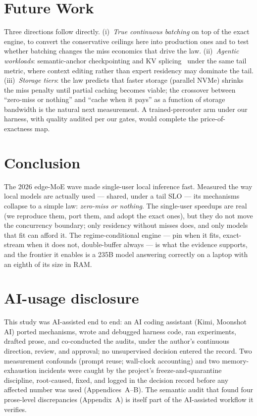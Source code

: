 \documentclass[11pt]{article}
\begin{document}
\section{Future Work}
\label{sec:future}

Three directions follow directly. (i)~\emph{True continuous batching} on
top of the exact engine, to convert the conservative ceilings here into
production ones and to test whether batching changes the miss economics
that drive the law. (ii)~\emph{Agentic workloads}: semantic-anchor
checkpointing and KV splicing~\cite{leyline,continuum} under the same tail
metric, where context editing rather than expert residency may dominate the
tail. (iii)~\emph{Storage tiers}: the law predicts that faster storage
(parallel NVMe) shrinks the miss penalty until partial caching becomes
viable; the crossover between ``zero-miss or nothing'' and
``cache when it pays'' as a function of storage bandwidth is the natural
next measurement. A trained-prerouter arm under our harness, with quality
audited per our gates, would complete the price-of-exactness map.

\section{Conclusion}

The 2026 edge-MoE wave made single-user local inference fast. Measured the
way local models are actually used --- shared, under a tail SLO --- its
mechanisms collapse to a simple law: \emph{zero-miss or nothing}. The
single-user speedups are real (we reproduce them, port them, and adopt the
exact ones), but they do not move the concurrency boundary; only residency
without misses does, and only models that fit can afford it. The
regime-conditional engine --- pin when it fits, exact-stream when it does
not, double-buffer always --- is what the evidence supports, and the
frontier it enables is a 235B model answering correctly on a laptop with
an eighth of its size in RAM.

\section*{AI-usage disclosure}

This study was AI-assisted end to end: an AI coding assistant (Kimi, Moonshot
AI) ported mechanisms, wrote and debugged harness code, ran experiments,
drafted prose, and co-conducted the audits, under the author's continuous
direction, review, and approval; no unsupervised decision entered the record.
Two measurement confounds (prompt reuse; wall-clock accounting) and two
memory-exhaustion incidents were caught by the project's
freeze-and-quarantine discipline, root-caused, fixed, and logged in the
decision record before any affected number was used
(Appendices~A--B). The semantic audit that found four prose-level
discrepancies (Appendix~A) is itself part of the AI-assisted workflow it
verifies.
\end{document}
